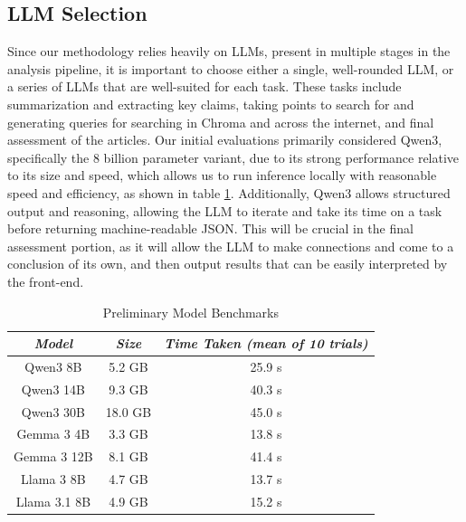 \documentclass[conference]{IEEEtran}
\begin{document}
\subsection{LLM Selection}
Since our methodology relies heavily on LLMs, present in multiple stages in the analysis pipeline, it is important to choose either a single, well-rounded LLM, or a series of LLMs that are well-suited for each task. These tasks include summarization and extracting key claims, taking points to search for and generating queries for searching in Chroma and across the internet, and final assessment of the articles. Our initial evaluations primarily considered Qwen3\cite{qwen3}, specifically the 8 billion parameter variant, due to its strong performance relative to its size and speed, which allows us to run inference locally with reasonable speed and efficiency, as shown in table \ref{tab:modelBenchmarks}. Additionally, Qwen3 allows structured output and reasoning, allowing the LLM to iterate and take its time on a task before returning machine-readable JSON. This will be crucial in the final assessment portion, as it will allow the LLM to make connections and come to a conclusion of its own, and then output results that can be easily interpreted by the front-end.
\begin{table}[ht]
    \centering
    \caption{Preliminary Model Benchmarks}
    \begin{tabular}{|c|c|c|}
        \hline
        \textbf{\textit{Model}} & \textbf{\textit{Size}} & \textbf{\textit{Time Taken (mean of 10 trials)}} \\ \hline
        Qwen3 8B & 5.2 GB & 25.9 s \\ \hline
        Qwen3 14B & 9.3 GB & 40.3 s \\ \hline
        Qwen3 30B & 18.0 GB & 45.0 s \\ \hline
        Gemma 3 4B & 3.3 GB & 13.8 s \\ \hline
        Gemma 3 12B & 8.1 GB & 41.4 s \\ \hline
        Llama 3 8B & 4.7 GB & 13.7 s \\ \hline
        Llama 3.1 8B & 4.9 GB & 15.2 s \\ \hline
    \end{tabular}
    \label{tab:modelBenchmarks}
\end{table}
\end{document}
